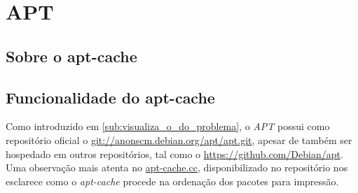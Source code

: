 \section{APT} %
\label{sec:apt}

\subsection{Sobre o apt-cache} %
\label{sub:sobre_o_apt_cache}


\subsection{Funcionalidade do apt-cache} %
\label{sub:funcionalidade_do_apt_cache}


Como introduzido em \ref{sub:visualiza_o_do_problema}, o \textit{APT} possui como repositório oficial o \url{git://anonscm.debian.org/apt/apt.git}, apesar de também ser hospedado em outros repositórios, tal como o \url{https://github.com/Debian/apt}. Uma observação mais atenta no \href{https://github.com/Debian/apt/blob/debian/experimental/cmdline/apt-cache.cc}{apt-cache.cc}, disponibilizado no repositório nos esclarece como o \textit{apt-cache} procede na ordenação dos pacotes para impressão.


